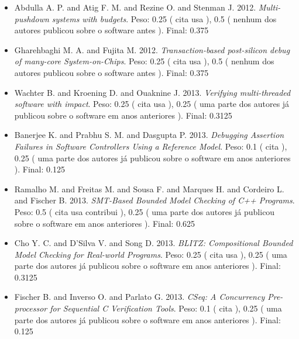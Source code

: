 \begin{itemize}
\item Abdulla A. P. and Atig F. M. and Rezine O. and Stenman J.
      2012.
        \textit{ Multi-pushdown systems with budgets}.
      Peso:
      0.25 (
          cita
          usa
      ),
      0.5 (
nenhum dos autores publicou sobre o software antes
      ).
      Final:
      0.375

\item Gharehbaghi M. A. and Fujita M.
      2012.
        \textit{ Transaction-based post-silicon debug of many-core System-on-Chips}.
      Peso:
      0.25 (
          cita
          usa
      ),
      0.5 (
nenhum dos autores publicou sobre o software antes
      ).
      Final:
      0.375

\item Wachter B. and Kroening D. and Ouaknine J.
      2013.
        \textit{ Verifying multi-threaded software with impact}.
      Peso:
      0.25 (
          cita
          usa
      ),
      0.25 (
uma parte dos autores já publicou sobre o software em anos anteriores
      ).
      Final:
      0.3125

\item Banerjee K. and Prabhu S. M. and Dasgupta P.
      2013.
        \textit{ Debugging Assertion Failures in Software Controllers Using a Reference Model}.
      Peso:
      0.1 (
          cita
      ),
      0.25 (
uma parte dos autores já publicou sobre o software em anos anteriores
      ).
      Final:
      0.125

\item Ramalho M. and Freitas M. and Sousa F. and Marques H. and Cordeiro L. and Fischer B.
      2013.
        \textit{ SMT-Based Bounded Model Checking of C++ Programs}.
      Peso:
      0.5 (
          cita
          usa
          contribui
      ),
      0.25 (
uma parte dos autores já publicou sobre o software em anos anteriores
      ).
      Final:
      0.625

\item Cho Y. C. and D'Silva V. and Song D.
      2013.
        \textit{ BLITZ: Compositional Bounded Model Checking for Real-world Programs}.
      Peso:
      0.25 (
          cita
          usa
      ),
      0.25 (
uma parte dos autores já publicou sobre o software em anos anteriores
      ).
      Final:
      0.3125

\item Fischer B. and Inverso O. and Parlato G.
      2013.
        \textit{ CSeq: A Concurrency Pre-processor for Sequential C Verification Tools}.
      Peso:
      0.1 (
          cita
      ),
      0.25 (
uma parte dos autores já publicou sobre o software em anos anteriores
      ).
      Final:
      0.125


\end{itemize}
